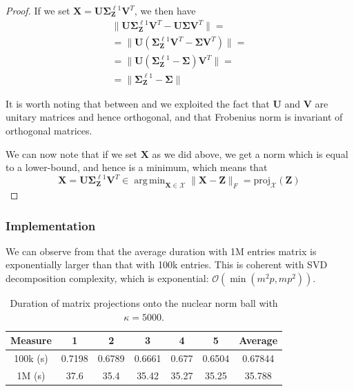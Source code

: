 \documentclass[12pt]{article}
\DeclareMathOperator*{\argmin}{arg\,min}
\newcommand{\boldZ}{\mathbf{Z}}
\newcommand{\boldX}{\mathbf{X}}
\newcommand{\boldU}{\mathbf{U}}
\newcommand{\boldV}{\mathbf{V}}
\newcommand{\setX}{\mathcal{X}}
\newcommand{\boldS}{\mathbf{\Sigma}}
\newcommand*{\proj}{\text{proj}}
\begin{document}
\begin{proof}
If we set $\boldX = \boldU \boldS_{\boldZ}^{\ell1} \boldV^T$, we then have
\begin{gather}
    \lVert \boldU \boldS_{\boldZ}^{\ell1} \boldV^T - \boldU \boldS \boldV^T \rVert = \\
    = \lVert \boldU (\boldS_{\boldZ}^{\ell1} \boldV^T - \boldS \boldV^T) \rVert = \\
    = \lVert \boldU (\boldS_{\boldZ}^{\ell1} - \boldS) \boldV^T \rVert = \label{eq:frob-invariance-1} \\
    = \lVert \boldS_{\boldZ}^{\ell1} - \boldS \rVert \label{eq:frob-invariance-2}
\end{gather}

It is worth noting that between  and  we exploited the fact that $\boldU$ and $\boldV$ are unitary matrices and hence orthogonal, and that Frobenius norm is invariant of orthogonal matrices.

We can now note that if we set $\boldX$ as we did above, we get a norm which is equal to a lower-bound, and hence is a minimum, which means that
\begin{equation}
    \boldX = \boldU \boldS_{\boldZ}^{\ell1} \boldV^T \in \argmin_{\boldX \in \setX} \lVert \boldX - \boldZ \rVert_{F} = \proj_{\setX}(\boldZ)
\end{equation}
\end{proof}

\subsubsection{Implementation}
We can observe from  that the average duration with 1M entries matrix is exponentially larger than that with 100k entries. This is coherent with SVD decomposition complexity, which is exponential: $\mathcal{O}(\min(m^2p, mp^2))$.

\begin{table}[ht]
\centering
\caption{Duration of matrix projections onto the nuclear norm ball with $\kappa = 5000$.}
\label{tab:projections}
\begin{tabular}{ccccccc}
Measure & 1 & 2 & 3 & 4 & 5 & Average \\ \hline
100k (s) & 0.7198 & 0.6789 & 0.6661 & 0.677 & 0.6504 & 0.67844 \\ \hline
1M (s) & 37.6 & 35.4 & 35.42 & 35.27 & 35.25 & 35.788
\end{tabular}
\end{table}
\end{document}
